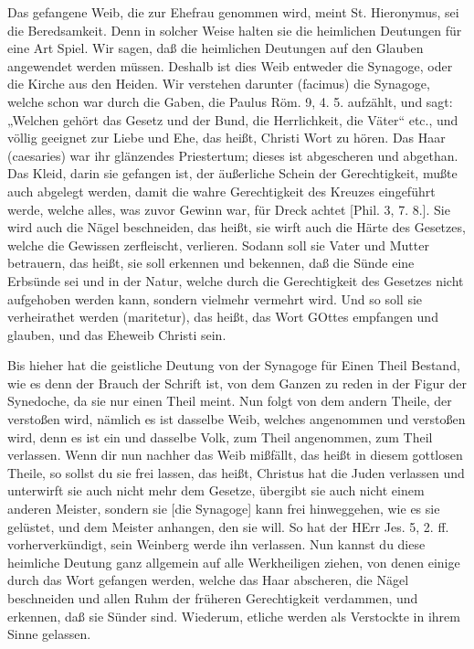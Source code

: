 Das gefangene Weib, die zur Ehefrau genommen wird, meint St. Hieronymus, sei die Beredsamkeit. Denn in solcher Weise halten sie die heimlichen Deutungen für eine Art Spiel. Wir sagen, daß die heimlichen Deutungen auf den Glauben angewendet werden müssen. Deshalb ist dies Weib entweder die Synagoge, oder die Kirche aus den Heiden. Wir verstehen darunter (facimus) die Synagoge, welche schon war durch die Gaben, die Paulus Röm. 9, 4. 5. aufzählt, und sagt: „Welchen gehört das Gesetz und der Bund, die Herrlichkeit, die Väter“ etc., und völlig geeignet zur Liebe und Ehe, das heißt, Christi Wort zu hören. Das Haar (caesaries) war ihr glänzendes Priestertum; dieses ist abgescheren und abgethan. Das Kleid, darin sie gefangen ist, der äußerliche Schein der Gerechtigkeit, mußte auch abgelegt werden, damit die wahre Gerechtigkeit des Kreuzes eingeführt werde, welche alles, was zuvor Gewinn war, für Dreck achtet [Phil. 3, 7. 8.]. Sie wird auch die Nägel beschneiden, das heißt, sie wirft auch die Härte des Gesetzes, welche die Gewissen zerfleischt, verlieren. Sodann soll sie Vater und Mutter betrauern, das heißt, sie soll erkennen und bekennen, daß die Sünde eine Erbsünde sei und in der Natur, welche durch die Gerechtigkeit des Gesetzes nicht aufgehoben werden kann, sondern vielmehr vermehrt wird. Und so soll sie verheirathet werden (maritetur), das heißt, das Wort GOttes empfangen und glauben, und das Eheweib Christi sein.

Bis hieher hat die geistliche Deutung von der Synagoge für Einen Theil Bestand, wie es denn der Brauch der Schrift ist, von dem Ganzen zu reden in der Figur der Synedoche, da sie nur einen Theil meint. Nun folgt von dem andern Theile, der verstoßen wird, nämlich es ist dasselbe Weib, welches angenommen und verstoßen wird, denn es ist ein und dasselbe Volk, zum
Theil angenommen, zum Theil verlassen. Wenn dir nun nachher das Weib mißfällt, das heißt in diesem gottlosen Theile, so sollst du sie frei lassen, das heißt, Christus hat die Juden verlassen und unterwirft sie auch nicht mehr dem Gesetze, übergibt sie auch nicht einem anderen Meister, sondern sie [die Synagoge] kann frei hinweggehen, wie es sie gelüstet, und dem Meister anhangen, den sie will. So hat der HErr Jes. 5, 2. ff. vorherverkündigt, sein Weinberg werde ihn verlassen. Nun kannst du diese heimliche Deutung ganz allgemein auf alle Werkheiligen ziehen, von denen einige durch das Wort gefangen werden, welche das Haar abscheren, die Nägel beschneiden und allen Ruhm der früheren Gerechtigkeit verdammen, und erkennen, daß sie Sünder sind. Wiederum, etliche werden als Verstockte in ihrem Sinne gelassen.

